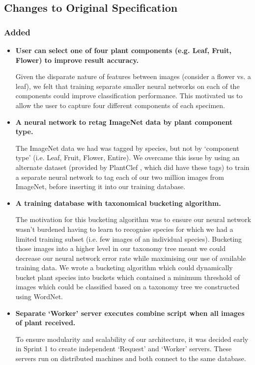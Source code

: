 \documentclass[a4paper,11pt]{article}
\begin{document}
\subsection{Changes to Original Specification}

\subsubsection{Added}

\begin{itemize}
  
 \item \textbf{User can select one of four plant components (e.g. Leaf, Fruit, Flower) to improve result accuracy.}
 
 Given the disparate nature of features between images (consider a flower vs. a leaf), we felt that training separate smaller neural networks on each of the components could improve classification performance. This motivated us to allow the user to capture four different components of each specimen.
 
  \item \textbf{A neural network to retag ImageNet data by plant component type.}
  
  The ImageNet data we had was tagged by species, but not by `component type' (i.e. Leaf, Fruit, Flower, Entire). We overcame this issue by using an alternate dataset (provided by PlantClef \cite{plantclef}, which did have these tags) to train a separate neural network to tag each of our two million images from ImageNet, before inserting it into our training database.
  
  \item \textbf{A training database with taxonomical bucketing algorithm.}
  
  The motivation for this bucketing algorithm was to ensure our neural network wasn't burdened having to learn to recognise species for which we had a limited training subset (i.e. few images of an individual species). Bucketing those images into a higher level in our taxonomy tree meant we could decrease our neural network error rate while maximising our use of available training data. We wrote a bucketing algorithm which could dynamically bucket plant species into buckets which contained a minimum threshold of images which could be classified based on a taxonomy tree we constructed using WordNet\cite{wordnet}. 
 
   
   \item \textbf{Separate `Worker' server executes combine script when all images of plant received.}
   
   To ensure modularity and scalability of our architecture, it was decided early in Sprint 1 to create independent `Request' and `Worker' servers. These servers run on  distributed machines and both connect to the same database.
   
\end{itemize}
\clearpage
\end{document}
